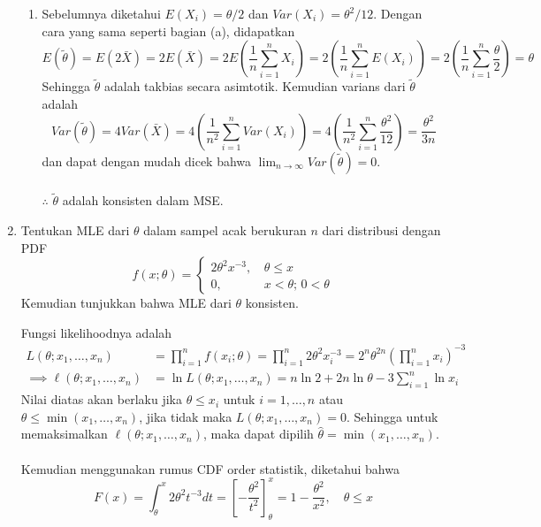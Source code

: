 \documentclass{exam}
\begin{document}
\begin{enumerate}
\begin{solution}
\begin{enumerate}
            \item Sebelumnya diketahui $E(X_i) = \theta/2$ dan $Var(X_i) = \theta^2/12$. Dengan cara yang sama seperti bagian (a), didapatkan
            \[E(\tilde{\theta}) = E(2\bar{X}) = 2E(\bar{X}) = 2E\left(\dfrac{1}{n}\sum_{i=1}^n X_i\right) = 2\left(\dfrac{1}{n}\sum_{i=1}^n E(X_i)\right) = 2\left(\dfrac{1}{n}\sum_{i=1}^n \dfrac{\theta}{2}\right) = \theta\]
            Sehingga $\tilde{\theta}$ adalah takbias secara asimtotik. Kemudian varians dari $\tilde{\theta}$ adalah
            \[Var(\tilde{\theta}) = 4Var(\bar{X}) = 4\left(\dfrac{1}{n^2}\sum_{i=1}^n Var(X_i)\right) = 4\left(\dfrac{1}{n^2}\sum_{i=1}^n \dfrac{\theta^2}{12}\right) = \dfrac{\theta^2}{3n}\]
            dan dapat dengan mudah dicek bahwa $\displaystyle\lim_{n\to\infty}Var(\tilde{\theta})=0$.\\~\\
            $\therefore$ $\tilde{\theta}$ adalah konsisten dalam MSE.
        \end{enumerate}
    \end{solution}
    \item Tentukan MLE dari $\theta$ dalam sampel acak berukuran $n$ dari distribusi dengan PDF
    \[f(x;\theta) = \begin{cases}
        2\theta^2 x^{-3}, &\,\theta\leq x\\
        0, &\,x<\theta;\,0<\theta 
    \end{cases}
    \]
    Kemudian tunjukkan bahwa MLE dari $\theta$ konsisten.
    \begin{solution}
        Fungsi likelihoodnya adalah
        \begin{align*}
            L(\theta;x_1,\dots,x_n) &= \prod_{i=1}^n f(x_i;\theta) = \prod_{i=1}^n 2\theta^2 x_i^{-3} = 2^n\theta^{2n}\left(\prod_{i=1}^n x_i\right)^{-3}\\
            \implies \ell(\theta;x_1,\dots,x_n) &= \ln L(\theta;x_1,\dots,x_n) = n\ln 2 + 2n\ln\theta - 3\sum_{i=1}^n\ln x_i
        \end{align*}
        Nilai diatas akan berlaku jika $\theta\leq x_i$ untuk $i=1,\dots,n$ atau $\theta\leq \min(x_1,\dots,x_n)$, jika tidak maka $L(\theta;x_1,\dots,x_n) = 0$. Sehingga untuk memaksimalkan $\ell(\theta;x_1,\dots,x_n)$, maka dapat dipilih $\hat{\theta} = \min(x_1,\dots,x_n)$.\\~\\
        Kemudian menggunakan rumus CDF order statistik, diketahui bahwa 
        \[\displaystyle F(x)=\int_\theta^x 2\theta^2 t^{-3}dt = \left[-\dfrac{\theta^2}{t^2}\right]_\theta^x = 1-\dfrac{\theta^2}{x^2}, \quad \theta\leq x\]

\end{solution}
\end{enumerate}
\end{document}
